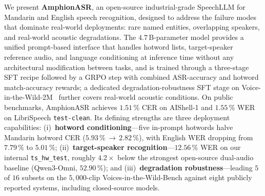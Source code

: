 We present \textbf{AmphionASR}, an open-source industrial-grade SpeechLLM for Mandarin and English speech recognition, designed to address the failure modes that dominate real-world deployments: rare named entities, overlapping speakers, and real-world acoustic degradations.
The $4.7$\,B-parameter model provides a unified prompt-based interface that handles hotword lists, target-speaker reference audio, and language conditioning at inference time without any architectural modification between tasks, and is trained through a three-stage SFT recipe followed by a GRPO step with combined ASR-accuracy and hotword match-accuracy rewards; a dedicated degradation-robustness SFT stage on Voice-in-the-Wild-2M~\cite{xie2026mega} further covers real-world acoustic conditions.
On public benchmarks, AmphionASR achieves $\mathbf{1.51}$\,\% CER on AIShell-1 and $\mathbf{1.55}$\,\% WER on LibriSpeech \texttt{test-clean}. Its defining strengths are three deployment capabilities: (i)~\textbf{hotword conditioning}---five in-prompt hotwords halve Mandarin hotword CER ($5.93$\,\%$\,{\to}\,$$\mathbf{2.82}$\,\%), with English WER dropping from $7.79$\,\% to $\mathbf{5.01}$\,\%; (ii)~\textbf{target-speaker recognition}---$\mathbf{12.56}$\,\% WER on our internal \texttt{ts\_hw\_test}, roughly $4.2\times$ below the strongest open-source dual-audio baseline (Qwen3-Omni, $52.90$\,\%); and (iii)~\textbf{degradation robustness}---leading $5$ of $16$ subsets on the $5{,}000$-clip Voices-in-the-Wild-Bench against eight publicly reported systems, including closed-source models.